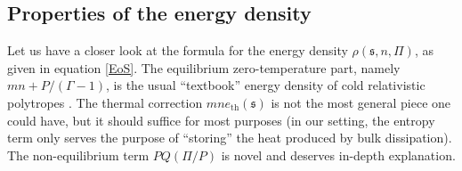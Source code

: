 \documentclass[a4paper, amsfonts, amssymb, amsmath, reprint, showkeys, nofootinbib, twoside,notitlepage,onecolumn]{revtex4-2}
\newcommand{\s}{{\mathfrak{s}}}
\theoremstyle{definition}
\theoremstyle{theorem}
\theoremstyle{corollary}
\begin{document}

\subsection{Properties of the energy density}\label{PropOfQ}
\vspace{-0.2cm}

Let us have a closer look at the formula for the energy density $\rho(\s,n,\Pi)$, as given in equation \eqref{EoS}. The equilibrium zero-temperature part, namely $mn+P/(\Gamma{-}1)$, is the usual ``textbook'' energy density of cold relativistic polytropes \cite{rezzolla_book}. The thermal correction $mne_\text{th}(\s)$ is not the most general piece one could have, but it should suffice for most purposes (in our setting, the entropy term only serves the purpose of ``storing'' the heat produced by bulk dissipation). The non-equilibrium term $PQ(\Pi/P)$ is novel and deserves in-depth explanation. 
\end{document}
